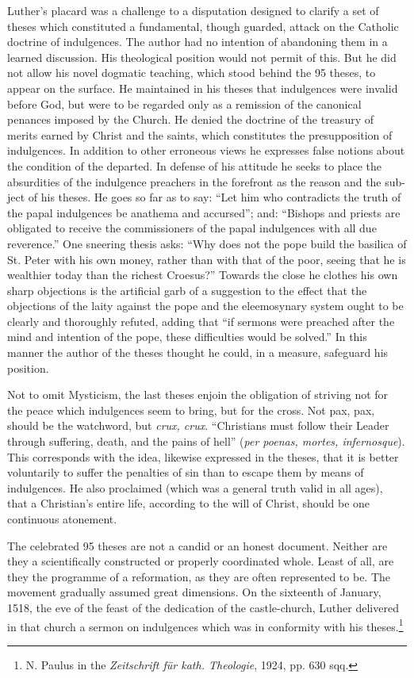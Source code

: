 Luther’s placard was a challenge to a disputation designed to clarify a
set of theses which constituted a fundamental, though guarded,
attack on the Catholic doctrine of indulgences. The author had no
intention of abandoning them in a learned discussion. His theological
position would not permit of this. But he did not allow his novel
dogmatic teaching, which stood behind the 95 theses, to appear on
the surface. He maintained in his theses that indulgences were invalid
before God, but were to be regarded only as a remission of the
canonical penances imposed by the Church. He denied the doctrine
of the treasury of merits earned by Christ and the saints, which
constitutes the presupposition of indulgences. In addition to other
erroneous views he expresses false notions about the condition of the
departed. In defense of his attitude he seeks to place the absurdities
of the indulgence preachers in the forefront as the reason and the sub-
ject of his theses. He goes so far as to say: “Let him who contradicts
the truth of the papal indulgences be anathema and accursed”; and:
“Bishops and priests are obligated to receive the commissioners of
the papal indulgences with all due reverence.” One sneering thesis
asks: “Why does not the pope build the basilica of St. Peter with his
own money, rather than with that of the poor, seeing that he is
wealthier today than the richest Croesus?” Towards the close he
clothes his own sharp objections is the artificial garb of a suggestion
to the effect that the objections of the laity against the pope and the
eleemosynary system ought to be clearly and thoroughly refuted,
adding that “if sermons were preached after the mind and intention
of the pope, these difficulties would be solved.” In this manner the
author of the theses thought he could, in a measure, safeguard his
position.

Not to omit Mysticism, the last theses enjoin the obligation of
striving not for the peace which indulgences seem to bring, but for
the cross. Not pax, pax, should be the watchword, but \textit{crux, crux}.
“Christians must follow their Leader through suffering, death, and
the pains of hell” (\textit{per poenas, mortes, infernosque}). This corresponds
with the idea, likewise expressed in the theses, that it is better voluntarily
to suffer the penalties of sin than to escape them by means of indulgences.
He also proclaimed (which was a general truth valid in
all ages), that a Christian’s entire life, according to the will of Christ,
should be one continuous atonement.

The celebrated 95 theses are not a candid or an honest document.
Neither are they a scientifically constructed or properly coordinated
whole. Least of all, are they the programme of a reformation, as they
are often represented to be.
The movement gradually assumed great dimensions. On the sixteenth
of January, 1518, the eve of the feast of the dedication of the
castle-church, Luther delivered in that church a sermon on indulgences
which was in conformity with his theses.\footnote
{N. Paulus in the \textit{Zeitschrift für kath. Theologie}, 1924, pp. 630 sqq.}

